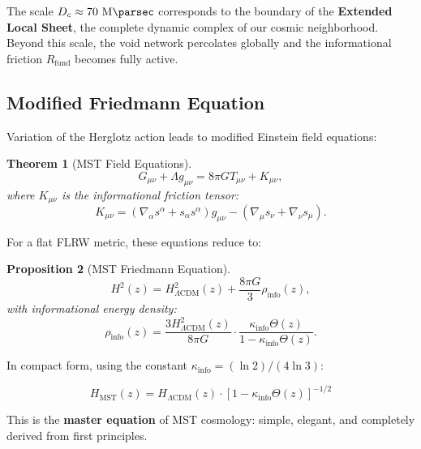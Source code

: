 \documentclass[11pt, a4paper]{article}
\theoremstyle{plain}
\newtheorem{theorem}{Theorem}[section]
\newtheorem{proposition}[theorem]{Proposition}
\theoremstyle{definition}
\newcommand{\Rfactor}{R_{\text{fund}}}
\newcommand{\Kinfo}{\kappa_{\text{info}}}
\begin{document}
The scale $D_c \approx 70\ \si{\mega\parsec}$ corresponds to the boundary of the \textbf{Extended Local Sheet}, the complete dynamic complex of our cosmic neighborhood. Beyond this scale, the void network percolates globally and the informational friction $\Rfactor$ becomes fully active.

\subsection{Modified Friedmann Equation}

Variation of the Herglotz action leads to modified Einstein field equations:

\begin{theorem}[MST Field Equations]
\begin{equation}
G_{\mu\nu} + \Lambda g_{\mu\nu} = 8\pi G T_{\mu\nu} + K_{\mu\nu},
\label{eq:field_equations}
\end{equation}
where $K_{\mu\nu}$ is the informational friction tensor:
\begin{equation}
K_{\mu\nu} = (\nabla_\alpha s^\alpha + s_\alpha s^\alpha) g_{\mu\nu} - (\nabla_\mu s_\nu + \nabla_\nu s_\mu).
\end{equation}
\end{theorem}

For a flat FLRW metric, these equations reduce to:

\begin{proposition}[MST Friedmann Equation]
\begin{equation}
H^2(z) = H^2_{\Lambda\text{CDM}}(z) + \frac{8\pi G}{3} \rho_{\text{info}}(z),
\label{eq:friedmann_mst_full}
\end{equation}
with informational energy density:
\begin{equation}
\rho_{\text{info}}(z) = \frac{3H^2_{\Lambda\text{CDM}}(z)}{8\pi G} \cdot \frac{\Kinfo \Theta(z)}{1 - \Kinfo \Theta(z)}.
\end{equation}
\end{proposition}

In compact form, using the constant $\Kinfo = (\ln 2)/(4\ln 3)$:

\begin{equation}
\boxed{H_{\text{MST}}(z) = H_{\Lambda\text{CDM}}(z) \cdot \left[1 - \Kinfo \Theta(z)\right]^{-1/2}}
\label{eq:friedmann_compact}
\end{equation}

This is the \textbf{master equation} of MST cosmology: simple, elegant, and completely derived from first principles.
\end{document}
